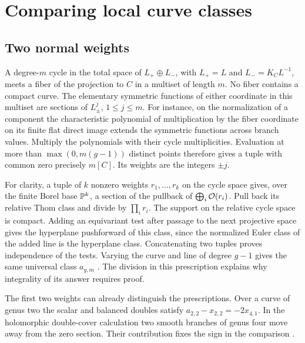 \section{Comparing local curve classes}\label{sec:comparison}

\subsection{Two normal weights}
A degree-$m$ cycle in the total space of $L_+\oplus L_-$, with
$L_+=L$ and $L_-=K_C L^{-1}$, meets a fiber of the projection to $C$
in a multiset of length $m$. No fiber contains a compact curve.
The elementary symmetric functions of either coordinate in this multiset
are sections of $L_\pm^j$, $1\le j\le m$. For instance, on the
normalization of a component the characteristic polynomial of
multiplication by the fiber coordinate on its finite flat direct image
extends the symmetric functions across branch values. Multiply the
polynomials with their cycle multiplicities. Evaluation at more than
$\max(0,m(g-1))$ distinct points therefore gives a tuple with common
zero precisely $m[C]$. Its weights are the integers $\pm j$.

For clarity, a tuple of $k$ nonzero weights $r_1,\ldots,r_k$ on the
cycle space gives, over the finite Borel base $\mathbb P^k$, a section of the
pullback of $\bigoplus_i\mathcal O(r_i)$. Pull back its relative Thom class and
divide by $\prod_i r_i$. The support on the relative cycle space is
compact. Adding an equivariant test after passage to the next projective
space gives the hyperplane pushforward of this class, since the normalized
Euler class of the added line is the hyperplane class. Concatenating two
tuples proves independence of the tests. Varying the curve and line of
degree $g-1$ gives the same universal class $a_{g,m}$
\cite[\S\S2--3]{WueBalanced}. The division in this prescription explains why
integrality of its answer requires proof.

The first two weights can already distinguish the prescriptions. Over a
curve of genus two the scalar and balanced doubles satisfy
$a_{2,2}-x_{2,2}=-2x_{4,1}$. In the holomorphic double-cover
calculation two smooth branches of genus four move away from the
zero section. Their contribution fixes the sign in the comparison
\cite[\S8]{WueProduct}.

